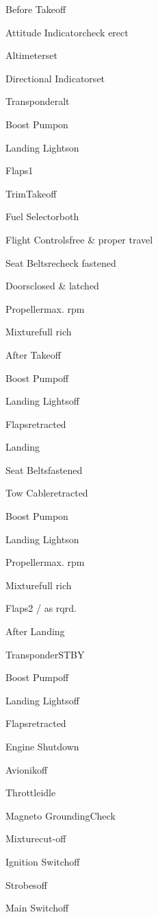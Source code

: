\documentclass[12pt]{article}
\begin{document}
\begin{checklist}{Before Takeoff}
  \item{Attitude Indicator}{check erect}
  \item{Altimeter}{set}
  \item{Directional Indicator}{set}
  \item{Transponder}{alt}
  \item{Boost Pump}{on}
  \item{Landing Lights}{on}
  \item{Flaps}{1}
  \item{Trim}{Takeoff}
  \item{Fuel Selector}{both}
  \item{Flight Controls}{free \& proper travel}
  \item{Seat Belts}{recheck fastened}
  \item{Doors}{closed \& latched}
  \item{Propeller}{max. rpm}
  \item{Mixture}{full rich}
\end{checklist}

\begin{checklist}{After Takeoff}
  \item{Boost Pump}{off}
  \item{Landing Lights}{off}
  \item{Flaps}{retracted}
\end{checklist}

\begin{checklist}{Landing}
  \item{Seat Belts}{fastened}
  \item{Tow Cable}{retracted}
  \item{Boost Pump}{on}
  \item{Landing Lights}{on}
  \item{Propeller}{max. rpm}
  \item{Mixture}{full rich}
  \item{Flaps}{2 / as rqrd.}
\end{checklist}

\begin{checklist}{After Landing}
  \item{Transponder}{STBY}
  \item{Boost Pump}{off}
  \item{Landing Lights}{off}
  \item{Flaps}{retracted}
\end{checklist}

\begin{checklist}{Engine Shutdown}
  \item{Avionik}{off}
  \item{Throttle}{idle}
  \item{Magneto Grounding}{Check}
  \item{Mixture}{cut-off}
  \item{Ignition Switch}{off}
  \item{Strobes}{off}
  \item{Main Switch}{off}
\end{checklist}
\end{document}
